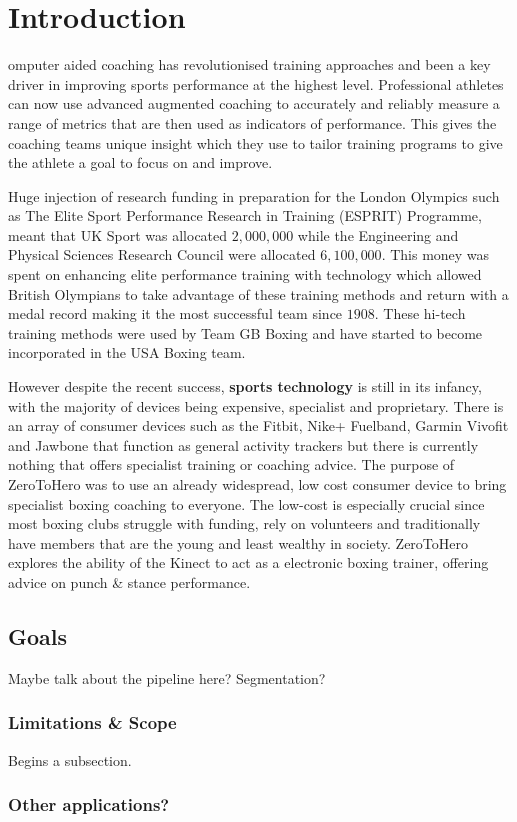 %
%
\let\textcircled=\pgftextcircled
\chapter{Introduction}
\label{chap:intro}

omputer aided coaching has revolutionised training approaches and been a key driver in improving sports performance at the highest level. Professional athletes can now use advanced augmented coaching to accurately and reliably measure a range of metrics that are then used as indicators of performance.\cite{aug0} This gives the coaching teams unique insight which they use to tailor training programs to give the athlete a goal to focus on and improve.\newline

Huge injection of research funding in preparation for the London Olympics such as The Elite Sport Performance Research in Training (ESPRIT) Programme, meant that UK Sport was allocated \textsterling $2,000,000$  while the Engineering and Physical Sciences Research Council were allocated \textsterling $6,100,000$.\cite{aug5} This money was spent on enhancing elite performance training with technology \cite{aug3} \cite{aug4} which allowed British Olympians to take advantage of these training methods and return with a medal record making it the most successful team since $1908$.\cite{olymp1} These hi-tech training methods were used by Team GB Boxing \cite{aug2} and have started to become incorporated in the USA Boxing team.\cite{aug1}

However despite the recent success, {\bf sports technology} is still in its infancy, with the majority of devices being expensive, specialist and proprietary\cite{aug7}. There is an array of consumer devices such as the Fitbit, Nike+ Fuelband, Garmin Vivofit and Jawbone that function as general activity trackers but there is currently nothing that offers specialist training or coaching advice. The purpose of ZeroToHero was to use an already widespread, low cost consumer device to bring specialist boxing coaching to everyone. The low-cost is especially crucial since most boxing clubs struggle with funding, rely on volunteers and traditionally have members that are the young and least wealthy in society.\newline
ZeroToHero explores the ability of the Kinect to act as a electronic boxing trainer, offering advice on punch \& stance performance.
\section{Goals}
\label{sec:sec01}

Maybe talk about the pipeline here? Segmentation?

\subsection{Limitations \& Scope}
\label{subsec:subsec01}
Begins a subsection.


\subsection{Other applications?}
\label{subsec:subsec01}

